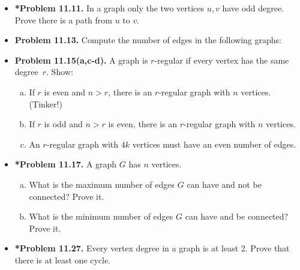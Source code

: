 \documentclass[11pt]{article}
\begin{document}
\begin{itemize}
\item \textbf{*Problem 11.11.}
In a graph only the two vertices $u,v$ have odd degree.
Prove there is a path from $u$ to $v$.

\vspace{0.1in}

\item \textbf{Problem 11.13.}
Compute the number of edges in the following graphs:
\begin{enumerate}[(a)]
\end{enumerate}

\newpage

\item \textbf{Problem 11.15(a,c-d).}
A graph is $r$-regular if every vertex has the same degree~$r$. Show:
\begin{enumerate}[(a)]
\item If $r$ is even and $n>r$, there is an $r$-regular graph with $n$ vertices. (Tinker!)
\setcounter{enumi}{2}
\item If $r$ is odd and $n>r$ is even, there is an $r$-regular graph with $n$ vertices.
\item An $r$-regular graph with $4k$ vertices must have an even number of edges.
\end{enumerate}

\vspace{0.1in}

\item \textbf{*Problem 11.17.}
A graph $G$ has $n$ vertices.
\begin{enumerate}[(a)]
\item What is the maximum number of edges $G$ can have and not be connected? Prove it.
\item What is the minimum number of edges $G$ can have and be connected? Prove it.
\end{enumerate}

\vspace{0.1in}

\item \textbf{*Problem 11.27.}
Every vertex degree in a graph is at least 2.
Prove that there is at least one cycle.

\end{itemize}
\end{document}
